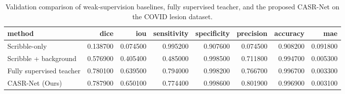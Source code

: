 \begin{table}
\caption{Validation comparison of weak-supervision baselines, fully supervised teacher, and the proposed CASR-Net on the COVID lesion dataset.}
\label{tab:covid_lesion_final_comparison}
\begin{tabular}{lrrrrrrr}
\toprule
method & dice & iou & sensitivity & specificity & precision & accuracy & mae \\
\midrule
Scribble-only & 0.138700 & 0.074500 & 0.995200 & 0.907600 & 0.074500 & 0.908200 & 0.091800 \\
Scribble + background & 0.576900 & 0.405400 & 0.485000 & 0.998500 & 0.711800 & 0.994700 & 0.005300 \\
Fully supervised teacher & 0.780100 & 0.639500 & 0.794000 & 0.998200 & 0.766700 & 0.996700 & 0.003300 \\
CASR-Net (Ours) & 0.787900 & 0.650100 & 0.774400 & 0.998600 & 0.801900 & 0.996900 & 0.003100 \\
\bottomrule
\end{tabular}
\end{table}
